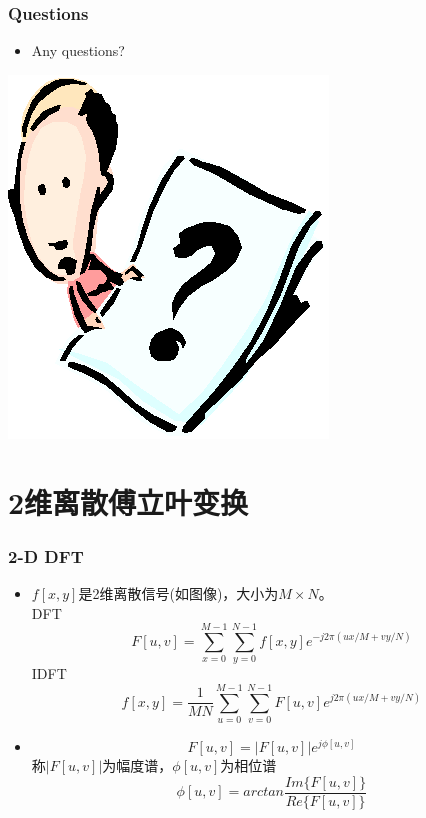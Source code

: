 \documentclass[CJKutf8,xcolor=pdftex,dvipsnames,table]{beamer}
\begin{document}
\begin{CJK*}{UTF8}{song}
  \begin{frame}
    \frametitle{Questions}
    \begin{itemize}
    \item Any questions?
    \end{itemize}
    \begin{center}
      \includegraphics[scale=.5]{question}
    \end{center}
  \end{frame}  
  
  \section{2维离散傅立叶变换}

  \begin{frame}
    \frametitle{2-D DFT}
    \begin{itemize}
    \item $f[x, y]$是2维离散信号(如图像)，大小为$M \times N$。\\
    DFT
    \[
    	F[u, v] = \sum_{x=0}^{M-1} \sum_{y=0}^{N-1} f[x, y] e^{-j2\pi (ux/M+vy/N)}
    \]
    IDFT
    \[
    	f[x, y] = \frac{1}{MN}\sum_{u=0}^{M-1} \sum_{v=0}^{N-1} F[u, v] e^{j2\pi (ux/M+vy/N)}    
    \]
    
    \item
    \[
    	F[u, v] = |F[u, v]|e^{j\phi[u, v]}
    \]
    称$|F[u, v]|$为幅度谱，$\phi[u,v]$为相位谱
    \[
    	\phi[u, v] = arctan\frac{\mathit{Im}\{F[u, v]\}}{\mathit{Re}\{F[u, v]\}}
    \]
    \end{itemize}
    
  \end{frame}  
  

\end{CJK*}
\end{document}
